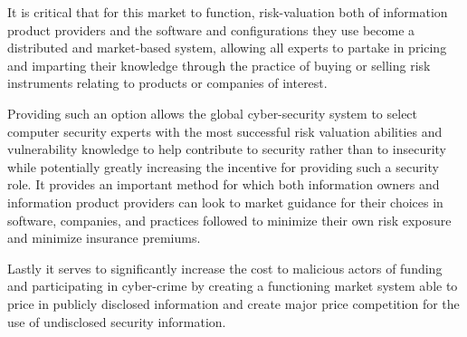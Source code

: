 \documentclass[conference]{IEEEtran}
\begin{document}
It is critical that for this market to function, risk-valuation both of information product providers and the software and configurations they use become a distributed and market-based system, allowing all experts to partake in pricing and imparting their knowledge through the practice of buying or selling risk instruments relating to products or companies of interest.  

Providing such an option allows the global cyber-security system to select computer security experts with the most successful risk valuation abilities and vulnerability knowledge to help contribute to security rather than to insecurity while potentially greatly increasing the incentive for providing such a security role.  It provides an important method for which both information owners and information product providers can look to market guidance for their choices in software, companies, and practices followed to minimize their own risk exposure and minimize insurance premiums.  

Lastly it serves to significantly increase the cost to malicious actors of funding and participating in cyber-crime by creating a functioning market system able to price in publicly disclosed information and create major price competition for the use of undisclosed security information.

\appendices




\nocite{friedman1990free}
\nocite{ehrlich1972market}
\nocite{anderson2006economics}

\printbibliography
\end{document}
